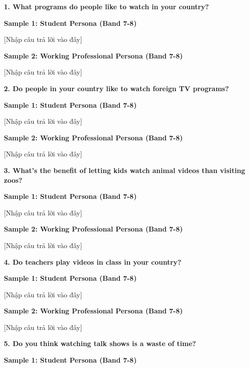 \partthreeheader

\begin{ieltsquestion}
\textbf{1. What programs do people like to watch in your country?}
\end{ieltsquestion}
\textbf{Sample 1: Student Persona (Band 7-8)}

[Nhập câu trả lời vào đây]

\textbf{Sample 2: Working Professional Persona (Band 7-8)}

[Nhập câu trả lời vào đây]

\separator

\begin{ieltsquestion}
\textbf{2. Do people in your country like to watch foreign TV programs?}
\end{ieltsquestion}
\textbf{Sample 1: Student Persona (Band 7-8)}

[Nhập câu trả lời vào đây]

\textbf{Sample 2: Working Professional Persona (Band 7-8)}

[Nhập câu trả lời vào đây]

\separator

\begin{ieltsquestion}
\textbf{3. What's the benefit of letting kids watch animal videos than visiting zoos?}
\end{ieltsquestion}
\textbf{Sample 1: Student Persona (Band 7-8)}

[Nhập câu trả lời vào đây]

\textbf{Sample 2: Working Professional Persona (Band 7-8)}

[Nhập câu trả lời vào đây]

\separator

\begin{ieltsquestion}
\textbf{4. Do teachers play videos in class in your country?}
\end{ieltsquestion}
\textbf{Sample 1: Student Persona (Band 7-8)}

[Nhập câu trả lời vào đây]

\textbf{Sample 2: Working Professional Persona (Band 7-8)}

[Nhập câu trả lời vào đây]

\separator

\begin{ieltsquestion}
\textbf{5. Do you think watching talk shows is a waste of time?}
\end{ieltsquestion}
\textbf{Sample 1: Student Persona (Band 7-8)}

